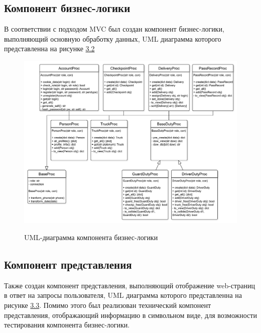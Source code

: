 \newpage
\subsection{Компонент бизнес-логики}
В соответствии с подходом MVC был создан компонент бизнес-логики, выполняющий основную обработку данных, UML диаграмма которого представленна на рисунке \hyperref[model_pic]{3.2}  

\begin{figure}[h!] \label{model_pic}
	\begin{center}
		{\includegraphics[scale=0.5, angle=0]{uml/business_models.pdf}}
		\caption{UML-диаграмма компонента бизнес-логики}
	\end{center}
\end{figure}

\newpage
\subsection{Компонент представления}
Также создан компонент представления, выполняющий отображение web-страниц в ответ на запросы пользователя, UML диаграмма которого представленна на рисунке \hyperref[view_pic]{3.3}. Помимо этого был реализован технический компонент представления, отображающий информацию в символьном виде, для возможности тестирования компонента бизнес-логики.


